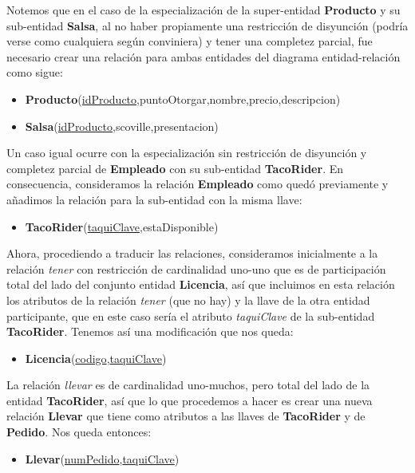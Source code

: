 \documentclass[11pt,letterpaper]{article}
\begin{document}
Notemos que en el caso de la especialización de la super-entidad \textbf{Producto} y su sub-entidad \textbf{Salsa}, al no haber propiamente una restricción de disyunción (podría verse como cualquiera según conviniera) y tener una completez parcial, fue necesario crear una relación para ambas entidades del diagrama entidad-relación como sigue:

\begin{itemize}
\item \footnotesize{\textbf{Producto}(\underline{idProducto},puntoOtorgar,nombre,precio,descripcion)}
\item \footnotesize{\textbf{Salsa}(\underline{idProducto},scoville,presentacion)}
\end{itemize}

Un caso igual ocurre con la especialización sin restricción de disyunción y completez parcial de \textbf{Empleado} con su sub-entidad \textbf{TacoRider}. En consecuencia, consideramos la relación \textbf{Empleado} como quedó previamente y añadimos la relación para la sub-entidad con la misma llave:

\begin{itemize}
\item \footnotesize{\textbf{TacoRider}(\underline{taquiClave},estaDisponible)}
\end{itemize}

Ahora, procediendo a traducir las relaciones, consideramos inicialmente a la relación \textit{tener} con restricción de cardinalidad uno-uno que es de participación total del lado del conjunto entidad \textbf{Licencia}, así que incluimos en esta relación los atributos de la relación \textit{tener} (que no hay) y la llave de la otra entidad participante, que en este caso sería el atributo \textit{taquiClave} de la sub-entidad \textbf{TacoRider}. Tenemos así una modificación que nos queda:

\begin{itemize}
\item \footnotesize{\textbf{Licencia}(\underline{codigo},\underline{taquiClave}})
\end{itemize}

La relación \textit{llevar} es de cardinalidad uno-muchos, pero total del lado de la entidad \textbf{TacoRider}, así que lo que  procedemos a hacer es crear una nueva relación \textbf{Llevar} que tiene como atributos a las llaves de \textbf{TacoRider} y de \textbf{Pedido}. Nos queda entonces:



\begin{itemize}
\item \footnotesize{\textbf{Llevar}(\underline{numPedido},\underline{taquiClave})}
\end{itemize}
\end{document}
